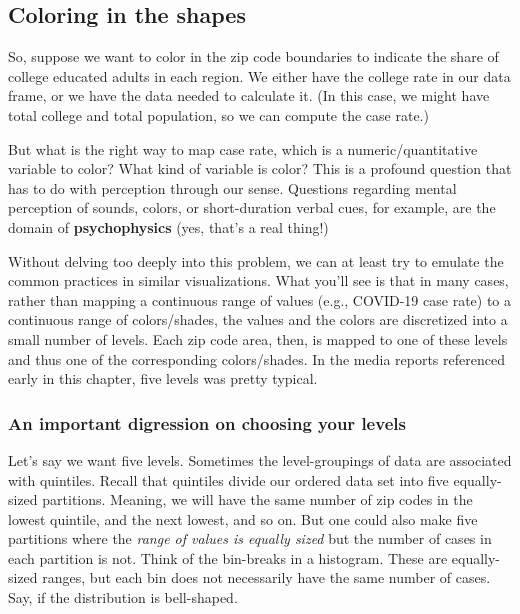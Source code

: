 \documentclass[openany]{book}
\begin{document}
\hypertarget{coloring-in-the-shapes}{%
\subsection*{Coloring in the shapes}\label{coloring-in-the-shapes}}

So, suppose we want to color in the zip code boundaries to indicate the share of college educated adults in each region. We either have the college rate in our data frame, or we have the data needed to calculate it. (In this case, we might have total college and total population, so we can compute the case rate.)

But what is the right way to map case rate, which is a numeric/quantitative variable to color? What kind of variable is color? This is a profound question that has to do with perception through our sense. Questions regarding mental perception of sounds, colors, or short-duration verbal cues, for example, are the domain of \textbf{psychophysics} (yes, that's a real thing!)

Without delving too deeply into this problem, we can at least try to emulate the common practices in similar visualizations. What you'll see is that in many cases, rather than mapping a continuous range of values (e.g., COVID-19 case rate) to a continuous range of colors/shades, the values and the colors are discretized into a small number of levels. Each zip code area, then, is mapped to one of these levels and thus one of the corresponding colors/shades. In the media reports referenced early in this chapter, five levels was pretty typical.

\hypertarget{an-important-digression-on-choosing-your-levels}{%
\subsubsection*{An important digression on choosing your levels}\label{an-important-digression-on-choosing-your-levels}}

Let's say we want five levels. Sometimes the level-groupings of data are associated with quintiles. Recall that quintiles divide our ordered data set into five equally-sized partitions. Meaning, we will have the same number of zip codes in the lowest quintile, and the next lowest, and so on. But one could also make five partitions where the \emph{range of values is equally sized} but the number of cases in each partition is not. Think of the bin-breaks in a histogram. These are equally-sized ranges, but each bin does not necessarily have the same number of cases. Say, if the distribution is bell-shaped.
\end{document}
